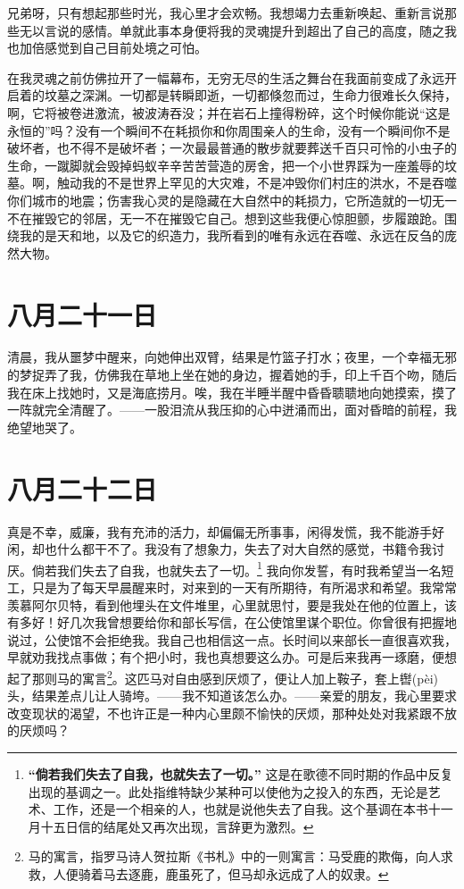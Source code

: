 \documentclass[12pt,oneside]{book}
\begin{document}
兄弟呀，只有想起那些时光，我心里才会欢畅。我想竭力去重新唤起、重新言说那些无以言说的感情。单就此事本身便将我的灵魂提升到超出了自己的高度，随之我也加倍感觉到自己目前处境之可怕。

在我灵魂之前仿佛拉开了一幅幕布，无穷无尽的生活之舞台在我面前变成了永远开启着的坟墓之深渊。一切都是转瞬即逝，一切都倏忽而过，生命力很难长久保持，啊，它将被卷进激流，被波涛吞没；并在岩石上撞得粉碎，这个时候你能说“这是永恒的”吗？没有一个瞬间不在耗损你和你周围亲人的生命，没有一个瞬间你不是破坏者，也不得不是破坏者；一次最最普通的散步就要葬送千百只可怜的小虫子的生命，一蹴脚就会毁掉蚂蚁辛辛苦苦营造的房舍，把一个小世界踩为一座羞辱的坟墓。啊，触动我的不是世界上罕见的大灾难，不是冲毁你们村庄的洪水，不是吞噬你们城市的地震；伤害我心灵的是隐藏在大自然中的耗损力，它所造就的一切无一不在摧毁它的邻居，无一不在摧毁它自己。想到这些我便心惊胆颤，步履踉跄。围绕我的是天和地，以及它的织造力，我所看到的唯有永远在吞噬、永远在反刍的庞然大物。


\chapter{八月二十一日}
清晨，我从噩梦中醒来，向她伸出双臂，结果是竹篮子打水；夜里，一个幸福无邪的梦捉弄了我，仿佛我在草地上坐在她的身边，握着她的手，印上千百个吻，随后我在床上找她时，又是海底捞月。唉，我在半睡半醒中昏昏聩聩地向她摸索，摸了一阵就完全清醒了。——一股泪流从我压抑的心中迸涌而出，面对昏暗的前程，我绝望地哭了。


\chapter{八月二十二日}
真是不幸，威廉，我有充沛的活力，却偏偏无所事事，闲得发慌，我不能游手好闲，却也什么都干不了。我没有了想象力，失去了对大自然的感觉，书籍令我讨厌。倘若我们失去了自我，也就失去了一切。\footnote{\textbf{“倘若我们失去了自我，也就失去了一切。”} 这是在歌德不同时期的作品中反复出现的基调之一。此处指维特缺少某种可以使他为之投入的东西，无论是艺术、工作，还是一个相亲的人，也就是说他失去了自我。这个基调在本书十一月十五日信的结尾处又再次出现，言辞更为激烈。} 我向你发誓，有时我希望当一名短工，只是为了每天早晨醒来时，对来到的一天有所期待，有所渴求和希望。我常常羡慕阿尔贝特，看到他埋头在文件堆里，心里就思忖，要是我处在他的位置上，该有多好！好几次我曾想要给你和部长写信，在公使馆里谋个职位。你曾很有把握地说过，公使馆不会拒绝我。我自己也相信这一点。长时间以来部长一直很喜欢我，早就劝我找点事做；有个把小时，我也真想要这么办。可是后来我再一琢磨，便想起了那则马的寓言\footnote{马的寓言，指罗马诗人贺拉斯《书札》中的一则寓言：马受鹿的欺侮，向人求救，人便骑着马去逐鹿，鹿虽死了，但马却永远成了人的奴隶。}。这匹马对自由感到厌烦了，便让人加上鞍子，套上辔(pèi)头，结果差点儿让人骑垮。——我不知道该怎么办。——亲爱的朋友，我心里要求改变现状的渴望，不也许正是一种内心里颇不愉快的厌烦，那种处处对我紧跟不放的厌烦吗？
\end{document}
